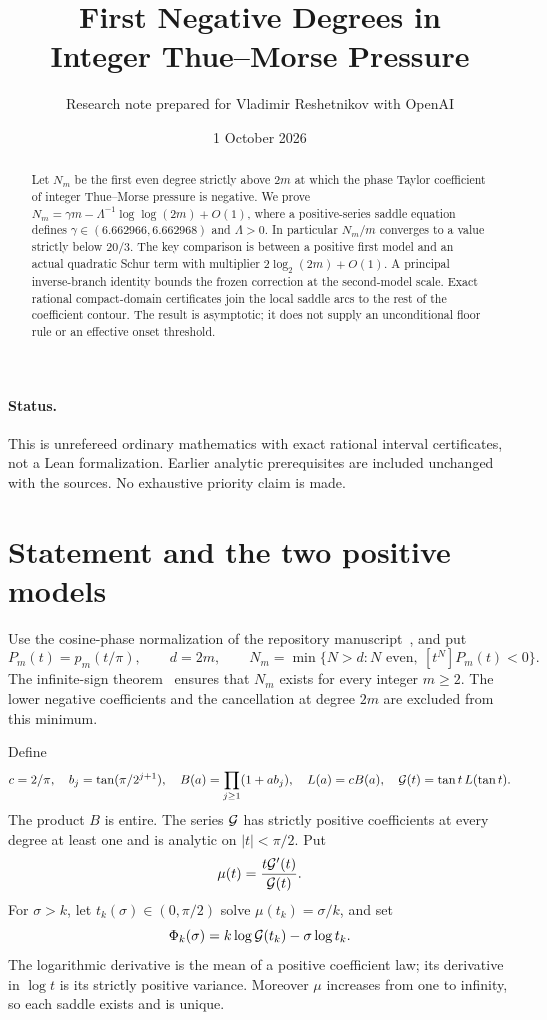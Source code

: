 \documentclass[11pt,a4paper]{article}
\title{First Negative Degrees in\\Integer Thue--Morse Pressure}
\author{Research note prepared for Vladimir Reshetnikov with OpenAI}
\date{1 October 2026}
\theoremstyle{remark}\newtheorem*{ednote}{Editorial note (ProveIt, 2026-10-01)}
\begin{document}
\maketitle
\begin{abstract}
Let $N_m$ be the first even degree strictly above $2m$ at which the phase Taylor coefficient of integer Thue--Morse pressure is negative. We prove
$N_m=\gamma m-\Lambda^{-1}\log\log(2m)+O(1)$, where a positive-series saddle equation defines $\gamma\in(6.662966,6.662968)$ and $\Lambda>0$. In particular $N_m/m$ converges to a value strictly below $20/3$. The key comparison is between a positive first model and an actual quadratic Schur term with multiplier $2\log_2(2m)+O(1)$. A principal inverse-branch identity bounds the frozen correction at the second-model scale. Exact rational compact-domain certificates join the local saddle arcs to the rest of the coefficient contour. The result is asymptotic; it does not supply an unconditional floor rule or an effective onset threshold.
\end{abstract}
\paragraph{Status.} This is unrefereed ordinary mathematics with exact rational interval certificates, not a Lean formalization. Earlier analytic prerequisites are included unchanged with the sources. No exhaustive priority claim is made.

\section{Statement and the two positive models}
Use the cosine-phase normalization of the repository manuscript~\cite{Repo}, and put
\[
 P_m(t)=p_m(t/\pi),\qquad d=2m,\qquad
 N_m=\min\{N>d:N\text{ even},\ [t^N]P_m(t)<0\}.
\]
The infinite-sign theorem~\cite{Signs} ensures that $N_m$ exists for every integer $m\ge2$. The lower negative coefficients and the cancellation at degree $2m$ are excluded from this minimum.

Define
\[
 c=2/\pi,\quad b_j=\tan(\pi/2^{j+1}),\quad
 B(a)=\prod_{j\ge1}(1+ab_j),\quad L(a)=cB(a),\quad
 \mathcal G(t)=\tan t\,L(\tan t).
\]
The product $B$ is entire. The series $\mathcal G$ has strictly positive coefficients at every degree at least one and is analytic on $|t|<\pi/2$. Put
\[
 \mu(t)=\frac{t\mathcal G'(t)}{\mathcal G(t)}.
\]
For $\sigma>k$, let $t_k(\sigma)\in(0,\pi/2)$ solve $\mu(t_k)=\sigma/k$, and set
\begin{equation}\label{eq:rates}
 \Phi_k(\sigma)=k\log\mathcal G(t_k)-\sigma\log t_k.
\end{equation}
The logarithmic derivative is the mean of a positive coefficient law; its derivative in $\log t$ is its strictly positive variance. Moreover $\mu$ increases from one to infinity, so each saddle exists and is unique.
\end{document}
